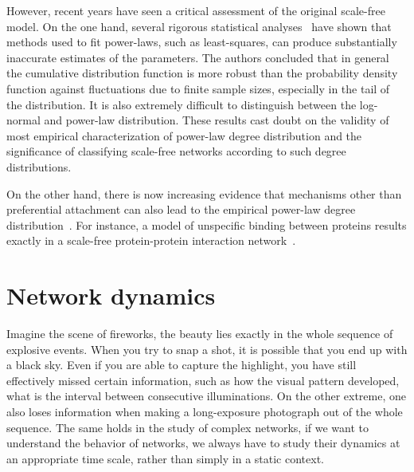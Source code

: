 However, recent years have seen a critical assessment of the original 
scale-free model. On the one hand, several rigorous statistical analyses~%
\citep{Clauset2009,Khanin2006a} have shown that methods used to fit power-laws, such as 
least-squares, can produce substantially inaccurate estimates of the 
parameters. The authors concluded that in general the cumulative distribution
function is more robust than the probability density function against 
fluctuations due to finite sample sizes, especially in the tail of the 
distribution. It is also extremely difficult to distinguish between
the log-normal and power-law distribution. These results cast doubt on the
validity of most empirical characterization of power-law degree distribution
and the significance of classifying scale-free networks according to such
degree distributions.

On the other hand, there is now increasing evidence that mechanisms other than
preferential attachment can also lead to the empirical power-law degree 
distribution~\citep{Caldarelli2002}. For instance, a model of unspecific 
binding between proteins results exactly in a scale-free protein-protein 
interaction network~\citep{Deeds2006}.

\section{Network dynamics}
Imagine the scene of fireworks, the beauty lies exactly in the whole sequence 
of explosive events. When you try to snap a shot, it is possible that you end up with
a black sky. Even if you are able to capture the highlight, 
you have still 
effectively missed certain information, such as how the 
visual pattern developed,
what is the interval between consecutive illuminations. 
On the other extreme, one also loses information when making
a long-exposure photograph out of the whole sequence.
The same holds in the
study of complex networks, if we want to understand the behavior of networks,
we always have to study their dynamics at an appropriate time scale, 
rather than simply in a static context.


